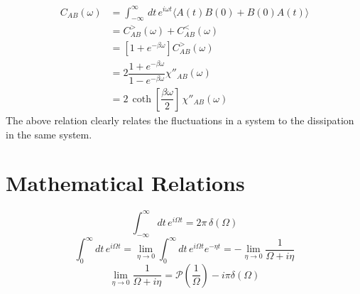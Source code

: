 \documentclass[aps,prb,onecolumn,notitlepage,showpacs,floatfix,superscriptaddress]{revtex4-1}
\newcommand{\cgr}{C^{>}_{AB}}
\newcommand{\clr}{C^{<}_{AB}}
\begin{document}
\begin{equation}
\begin{split}
C_{AB} (\omega) &= \int_{-\infty}^{\infty} \, dt \, e^{i \omega t} \langle A(t) B(0)+ B(0) A(t) \rangle \\
&= \cgr (\omega)+ \clr (\omega) \\
&= \left[ 1+ e^{-\beta \omega}\right] \cgr(\omega) \\
&= 2 \dfrac{1+ e^{-\beta \omega}}{1- e^{-\beta \omega}} \chi''_{AB} (\omega) \\
&= 2 \, \coth \left[ \dfrac{\beta \omega}{2} \right]  \, \chi''_{AB} (\omega) 
\end{split}
\end{equation} 
The above relation clearly relates the fluctuations in a system to the dissipation in the same system.

\section*{Mathematical Relations}
\begin{equation}
\int_{-\infty}^{\infty} dt \, e^{i \Omega t} = 2\pi\, \delta(\Omega)
\end{equation}
\begin{equation}
\int_{0}^{\infty} dt \, e^{i \Omega t} = \lim_{\eta \rightarrow 0} \int_{0}^{\infty} dt \, e^{i \Omega t}  e^{-\eta t} = - \lim_{\eta \rightarrow 0} \dfrac{1}{\Omega + i \eta}
\end{equation}
\begin{equation}
\lim_{\eta \rightarrow 0} \dfrac{1}{\Omega + i \eta} = \mathcal{P} \left( \dfrac{1}{\Omega} \right) - i \pi \delta(\Omega)
\end{equation}
\end{document}
